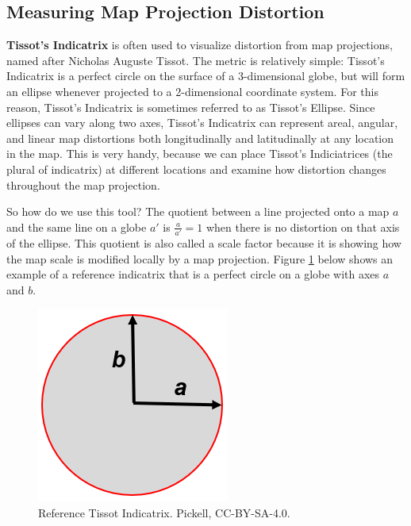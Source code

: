 \documentclass[
]{book}
\begin{document}
\subsection{Measuring Map Projection Distortion}\label{measuring-map-projection-distortion}

\textbf{Tissot's Indicatrix} is often used to visualize distortion from map projections, named after Nicholas Auguste Tissot. The metric is relatively simple: Tissot's Indicatrix is a perfect circle on the surface of a 3-dimensional globe, but will form an ellipse whenever projected to a 2-dimensional coordinate system. For this reason, Tissot's Indicatrix is sometimes referred to as Tissot's Ellipse. Since ellipses can vary along two axes, Tissot's Indicatrix can represent areal, angular, and linear map distortions both longitudinally and latitudinally at any location in the map. This is very handy, because we can place Tissot's Indiciatrices (the plural of indicatrix) at different locations and examine how distortion changes throughout the map projection.

So how do we use this tool? The quotient between a line projected onto a map \(a\) and the same line on a globe \(a'\) is \(\frac{a}{a'}=1\) when there is no distortion on that axis of the ellipse. This quotient is also called a scale factor because it is showing how the map scale is modified locally by a map projection. Figure \ref{fig:2-reference-indicatrix} below shows an example of a reference indicatrix that is a perfect circle on a globe with axes \(a\) and \(b\).

\begin{figure}
\includegraphics[width=0.75\linewidth]{images/02-reference-indicatrix} \caption{Reference Tissot Indicatrix. Pickell, CC-BY-SA-4.0.}\label{fig:2-reference-indicatrix}
\end{figure}
\end{document}
